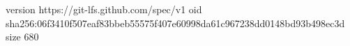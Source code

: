 version https://git-lfs.github.com/spec/v1
oid sha256:06f3410f507eaf83bbeb55575f407e60998da61c967238dd0148bd93b498ec3d
size 680
